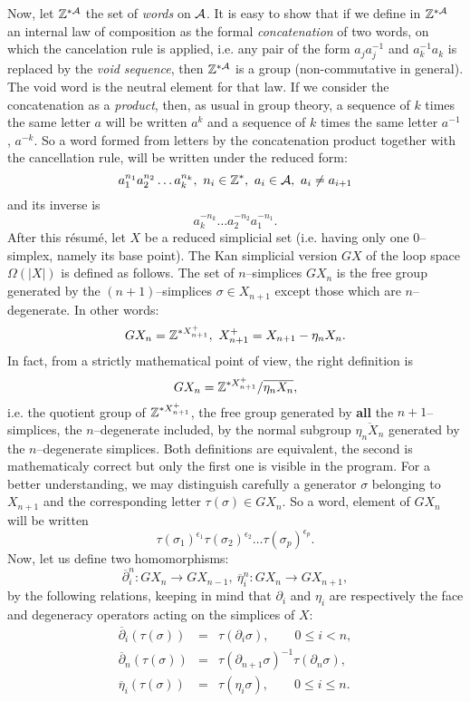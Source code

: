 Now, let ${\mathbb{Z}}^{*{\cal A}}$ the set of {\em  words} on $\cal A$.
It is easy to show that if we define in ${\mathbb{Z}}^{*{\cal A}}$ an internal law of composition as the
formal {\em concatenation} of two words,
on which the cancelation rule is applied, i.e. any pair of the form
$a_ja_j^{-1}$ and $a_k^{-1}a_k$ is replaced by the {\em void sequence},
then ${\mathbb{Z}}^{*{\cal A}}$ is a group (non-commutative in general).
The void word is the neutral element for that law. If we consider
the concatenation as a  {\em product}, then, as usual in group theory,
a sequence of $k$ times the same letter $a$
will be written $a^k$ and a sequence of $k$ times the same letter $a^{-1}$,
$a^{-k}$. So a word
formed from letters by the  concatenation product together with the cancellation rule,
will be written under the reduced form:
$$a_1^{n_1}a_2^{n_2}\ldots a_k^{n_k},\ n_i\in \mathbb{Z}^*,\ a_i\in {\cal A},\  a_i \not= a_{i+1}$$
and its inverse is
$$a_k^{-n_k}\ldots a_2^{-n_2}a_1^{-n_1}.$$
After this r\'esum\'e, let $X$ be a reduced simplicial set (i.e. having only one $0$--simplex,
namely its base point). The Kan simplicial version $GX$
of the loop space $\Omega(|X|)$ is defined as follows.
The set of $n$--simplices $GX_n$ is the free group generated by the $(n+1)$--simplices
$\sigma \in X_{n+1}$ except those which are $n$--degenerate. In other words:
$$ GX_n=\Z^{*X^+_{n+1}},\ X^+_{n+1}=X_{n+1}-\eta_n X_n. $$
In fact, from a strictly mathematical point of view, the right definition is
$$ GX_n = {\mathbb{Z}}^{*X^+_{n+1}} / {\overline{\eta_n X_n}},$$
i.e. the quotient group of ${\mathbb{Z}}^{*X^+_{n+1}}$, the free group generated by {\bf all} the $n+1$--simplices,
the $n$--degenerate included, by  the normal subgroup ${\overline{\eta_n X_n}}$ generated by
the $n$--degenerate simplices. Both definitions are equivalent, the second is mathematicaly
correct but only the first one is visible in the program.
\vskip 0.35cm
For a better understanding, we may distinguish carefully a generator $\sigma$ belonging to  $X_{n+1}$ and
the corresponding letter  $\tau (\sigma) \in GX_n$. So a word, element
of $GX_n$ will be written
$${\tau(\sigma_1)}^{\epsilon_1} {\tau(\sigma_2)}^{\epsilon_2} \ldots {\tau(\sigma_p)}^{\epsilon_p}.$$
Now, let us define two homomorphisms:
$$ \overline{\partial}_i^n: GX_n \longrightarrow GX_{n-1},\ \overline{\eta}_i^n: GX_n \longrightarrow GX_{n+1},$$
by the following relations, keeping in mind that $\partial_i$ and $\eta_i$ are respectively the face
and degeneracy operators acting on the  simplices of  $X$:
\begin{eqnarray*}
\overline{\partial}_i(\tau(\sigma))  & = & \tau(\partial_i\sigma),\qquad 0 \leq i < n, \\
\overline{\partial}_n(\tau(\sigma))  & = & \tau(\partial_{n+1}\sigma)^{-1}\tau(\partial_n\sigma), \\
\overline{\eta}_i(\tau(\sigma))    & = & \tau(\eta_i\sigma),\qquad 0 \leq i \leq n.
\end{eqnarray*}
